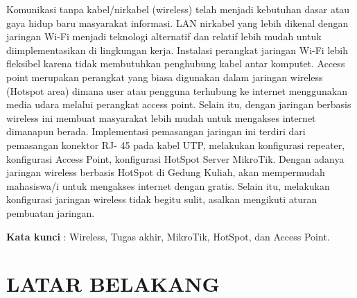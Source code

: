 \documentclass{jtetiproposalskripsi}
\begin{document}
\cover

\approvalpage


\begin{abstractind}
Komunikasi tanpa kabel/nirkabel (wireless) telah menjadi kebutuhan dasar atau gaya hidup baru masyarakat informasi. LAN nirkabel yang lebih dikenal dengan jaringan Wi-Fi menjadi teknologi alternatif dan relatif lebih mudah untuk diimplementasikan di lingkungan kerja. Instalasi perangkat jaringan Wi-Fi lebih fleksibel karena tidak membutuhkan penghubung kabel antar komputet. Access point  merupakan  perangkat  yang  biasa  digunakan  dalam  jaringan  wireless (Hotspot area) dimana user atau pengguna terhubung ke internet menggunakan media udara melalui perangkat access point. Selain itu, dengan jaringan berbasis wireless ini membuat masyarakat lebih mudah untuk mengakses internet dimanapun berada. Implementasi pemasangan jaringan ini terdiri dari pemasangan konektor RJ- 45 pada kabel UTP, melakukan konfigurasi repeater, konfigurasi Access Point, konfigurasi HotSpot Server MikroTik. Dengan adanya jaringan wireless berbasis HotSpot di Gedung Kuliah, akan mempermudah mahasiswa/i untuk mengakses internet dengan gratis. Selain itu, melakukan konfigurasi jaringan wireless tidak begitu sulit, asalkan mengikuti aturan pembuatan jaringan.

\bigskip
\textbf{Kata kunci} : Wireless, Tugas akhir, MikroTik, HotSpot, dan Access Point.
\end{abstractind}

\tableofcontents
{}
\clearpage{}\setcounter{page}{1}

\chapter{LATAR BELAKANG}
\end{document}
